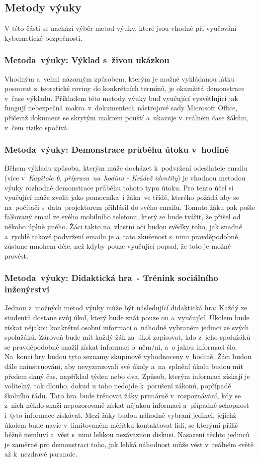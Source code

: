 \documentclass[a4paper, 12pt]{article}
\begin{document}
\subsection{Metody výuky}
V této části se nachází výběr metod výuky, které jsou vhodné při vyučování kybernetické bezpečnosti.

\subsubsection{Metoda~výuky: Výklad s~živou ukázkou}
Vhodným a~velmi názorným způsobem, kterým je možné vykládanou látku posouvat z~teoretické roviny do konkrétních termínů, je okamžitá demonstrace v~čase výkladu. Příkladem této metody výuky buď vyučující vysvětlující jak fungují nebezpečná makra~v~dokumentech nástrojové sady Microsoft Office, přičemž dokument se skrytým makrem pouští a~ukazuje v~reálném čase žákům, v~čem riziko spočívá.

\subsubsection{Metoda~výuky: Demonstrace průběhu útoku v~hodině}
Během výkladu způsobu, kterým může docházet k~podvržení odesilatele emailu (více v~\textit{Kapitole 6, příprava~na~hodinu - Krádež identity}) je vhodnou metodou výuky rozhodně demonstrace průběhu tohoto typu útoku. Pro tento účel si vyučující může zvolit jako pomocníka~i žáka~ve třídě, kterého požádá aby se na~počítači s~data~projektorem přihlásil do svého emailu. Tomuto žáku pak pošle falšovaný email ze svého mobilního telefonu, který se bude tvářit, že přišel od někoho úplně jiného. Žáci takto na~vlastní oči budou svědky toho, jak snadné a~rychlé takové podvržení emailu je a~tato zkušenost s~nimi pravděpodobně zůstane mnohem déle, než kdyby pouze vyučující popsal, že toto je možné provést.

\subsubsection{Metoda~výuky: Didaktická hra~- Trénink sociálního inženýrství}
Jednou z~možných metod výuky může být následující didaktická hra: Každý ze studentů dostane svůj úkol, který bude znát pouze on a~vyučující. Úkolem bude získat nějakou konkrétní osobní informaci o~náhodně vybraném jedinci ze svých spolužáků. Zároveň bude mít každý žák za~úkol zapisovat, kdo z~jeho spolužáků se pravděpodobně snažil získat informaci o~něm/ní, a~o jakou informaci šlo. Na~konci hry budou tyto seznamy skupinově vyhodnoceny v~hodině. Žáci budou dále nainstruováni, aby nevyzrazovali své úkoly a~na~splnění úkolu budou mít předem daný čas, například týden nebo dva. Způsob, kterým informaci získají je volitelný, tak dlouho, dokud u toho nedojde k~porušení zákonů, popřípadě školního řádu. Tato hra~bude trénovat žáky primárně v~rozpoznávání, kdy se z~nich někdo snaží nepozorovaně získat nějakou informaci a~případně schopnost i~tyto informace získávat. Mezi žáky budou náhodně vybraní jedinci, jejichž úkolem bude navíc v~limitovaném měřítku kontaktovat lidi, se kterými příliš běžně nemluví a~vést s~nimi lehkou nezávaznou diskusi. Nasazení těchto jedinců je zaměrné pro demonstraci toho, jak lehká náhodnost může vést v~reálném světě až k~nezdravé paranoie.
\end{document}
